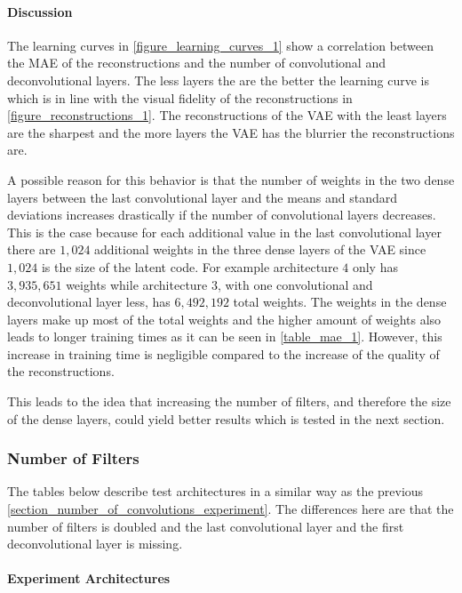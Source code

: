 \paragraph{Discussion}

The learning curves in \autoref{figure_learning_curves_1} show a correlation between the MAE of the
reconstructions and the number of convolutional and deconvolutional layers. The less layers the are the better
the learning curve is which is in line with the visual fidelity of the reconstructions in 
\autoref{figure_reconstructions_1}. The reconstructions of the VAE with the least layers are the sharpest and the 
more layers the VAE has the blurrier the reconstructions are. 

A possible reason for this behavior is that the number of weights in the two dense layers between the 
last convolutional layer and the means and standard deviations increases drastically
if the number of convolutional layers decreases. This is the case because for each additional
value in the last convolutional layer there are $1,024$ additional weights in the three dense layers of the VAE
since $1,024$ is the size of the latent code. For example architecture $4$ only has $3,935,651$ weights while
architecture $3$, with one convolutional and deconvolutional layer less, has $6,492,192$ total weights.
The weights in the dense layers make up most of the total weights
and the higher amount of weights also leads to longer training times as it can be seen in \autoref{table_mae_1}.
However, this increase in training time is negligible compared to the increase of the quality of the reconstructions. 

This leads to the idea that increasing the number of filters, and therefore the size of the dense layers, could yield
better results which is tested in the next section.



\subsubsection{Number of Filters} \label{section_number_of_filters}

The tables below describe test architectures in a similar way as the previous 
\autoref{section_number_of_convolutions_experiment}. The differences here are that the number of filters is doubled and
the last convolutional layer and the first deconvolutional layer is missing.

\paragraph{Experiment Architectures}

